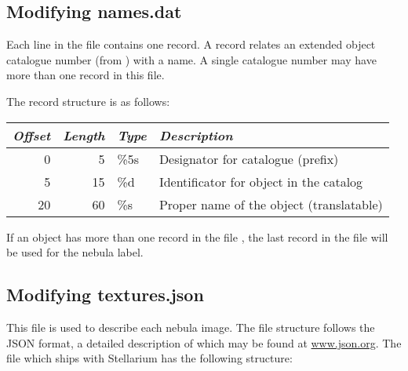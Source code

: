 \subsection{Modifying names.dat}%
\label{sec:dso:modifyingNamesDat}

Each line in the file   contains one record. A record
relates an extended object catalogue number (from )
with a name. A single catalogue number may have more than one record in
this file.

The record structure is as follows:

\noindent%
\begin{tabularx}{\textwidth}{r|r|l|X}
\toprule
\emph{Offset} & \emph{Length} & \emph{Type} & \emph{Description}\\
\midrule
0  &  5 & \%5s & Designator for catalogue (prefix)\\
5  & 15 & \%d  & Identificator for object in the catalog\\
20 & 60 & \%s  & Proper name of the object (translatable)\\
\bottomrule
\end{tabularx}

\noindent If an object has more than one record in the file ,
the last record in the file will be used for the nebula label.

\subsection{Modifying textures.json}%
\label{sec:dso:modifyingTexturesJson}

This file is used to describe each nebula image. The file structure
follows the JSON format, a detailed description of which may be found
at \url{www.json.org}. The  file which ships with
Stellarium has the following structure:


